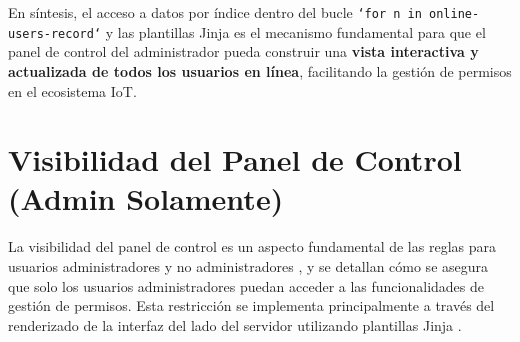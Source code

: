 \documentclass{report}
\begin{document}
En síntesis, el acceso a datos por índice dentro del bucle \texttt{`for n in online-users-record`} y las plantillas Jinja es el mecanismo fundamental 
para que el panel de control del administrador pueda construir una \textbf{vista interactiva y actualizada de todos los usuarios en línea}, 
facilitando la gestión de permisos en el ecosistema IoT.

\section{Visibilidad del Panel de Control (Admin Solamente)}
La  visibilidad del panel de control  es un aspecto fundamental de las  reglas para usuarios administradores y no administradores , y se  
detallan cómo se asegura que  solo los usuarios administradores  puedan acceder a las funcionalidades de gestión de permisos. Esta restricción se 
implementa principalmente a través del  renderizado de la interfaz del lado del servidor utilizando plantillas Jinja .
\end{document}
